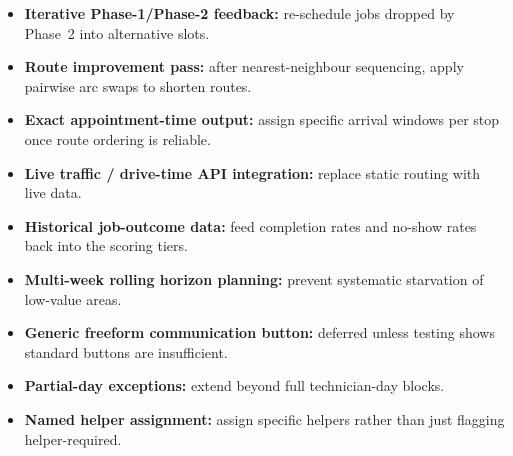 \documentclass[12pt]{article}
\begin{document}
\begin{itemize}
    \item \textbf{Iterative Phase-1/Phase-2 feedback:} re-schedule jobs dropped by Phase~2 into alternative slots.
    \item \textbf{Route improvement pass:} after nearest-neighbour sequencing, apply pairwise arc swaps to shorten routes.
    \item \textbf{Exact appointment-time output:} assign specific arrival windows per stop once route ordering is reliable.
    \item \textbf{Live traffic / drive-time API integration:} replace static routing with live data.
    \item \textbf{Historical job-outcome data:} feed completion rates and no-show rates back into the scoring tiers.
    \item \textbf{Multi-week rolling horizon planning:} prevent systematic starvation of low-value areas.
    \item \textbf{Generic freeform communication button:} deferred unless testing shows standard buttons are insufficient.
    \item \textbf{Partial-day exceptions:} extend beyond full technician-day blocks.
    \item \textbf{Named helper assignment:} assign specific helpers rather than just flagging helper-required.
\end{itemize}
\end{document}
